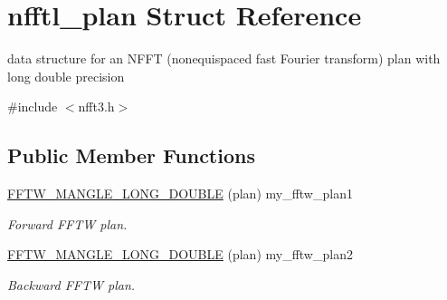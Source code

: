 \hypertarget{structnfftl__plan}{\section{nfftl\-\_\-plan Struct Reference}
\label{structnfftl__plan}
}


data structure for an N\-F\-F\-T (nonequispaced fast Fourier transform) plan with long double precision  




{\ttfamily \#include $<$nfft3.\-h$>$}

\subsection*{Public Member Functions}
\begin{DoxyCompactItemize}
\item 
\hypertarget{structnfftl__plan_ab17581f82946cc39584acd6b059b7809}{\hyperlink{structnfftl__plan_ab17581f82946cc39584acd6b059b7809}{F\-F\-T\-W\-\_\-\-M\-A\-N\-G\-L\-E\-\_\-\-L\-O\-N\-G\-\_\-\-D\-O\-U\-B\-L\-E} (plan) my\-\_\-fftw\-\_\-plan1}\label{structnfftl__plan_ab17581f82946cc39584acd6b059b7809}

\begin{DoxyCompactList}\small\item\em Forward F\-F\-T\-W plan. \end{DoxyCompactList}\item 
\hypertarget{structnfftl__plan_a2e9e81a72c786bd7ed4eef099a5f8a5e}{\hyperlink{structnfftl__plan_a2e9e81a72c786bd7ed4eef099a5f8a5e}{F\-F\-T\-W\-\_\-\-M\-A\-N\-G\-L\-E\-\_\-\-L\-O\-N\-G\-\_\-\-D\-O\-U\-B\-L\-E} (plan) my\-\_\-fftw\-\_\-plan2}\label{structnfftl__plan_a2e9e81a72c786bd7ed4eef099a5f8a5e}

\begin{DoxyCompactList}\small\item\em Backward F\-F\-T\-W plan. \end{DoxyCompactList}\end{DoxyCompactItemize}
